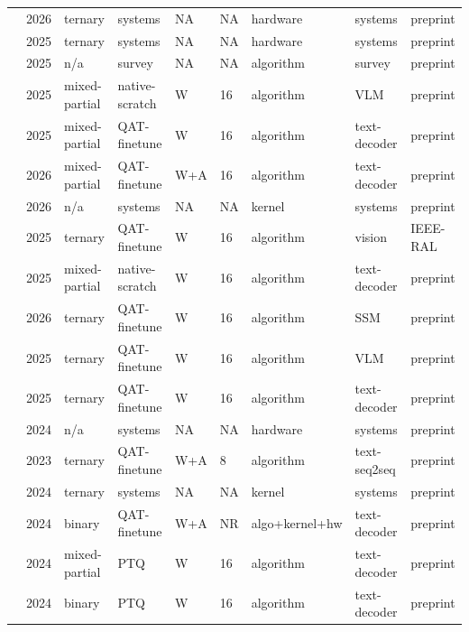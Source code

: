 \documentclass[11pt]{article}
\begin{document}
\begin{landscape}
\begin{longtable}{p{3.2cm} p{1cm} p{1.9cm} p{2.2cm} p{2.2cm} p{1.3cm} p{2.2cm} p{2.1cm} p{2.5cm}}
\citet{Guan2026-TOM} & 2026 & ternary & systems & NA & NA & hardware & systems & preprint \\
\citet{Qiao2025-TeLLMev2} & 2025 & ternary & systems & NA & NA & hardware & systems & preprint \\
\citet{Jorgensen2025-ResourceEfficientLMs} & 2025 & n/\allowbreak{}a & survey & NA & NA & algorithm & survey & preprint \\
\citet{Aman2025-BitMar} & 2025 & mixed-partial & native-scratch & W & 16 & algorithm & VLM & preprint \\
\citet{Chen2025-R2Q} & 2025 & mixed-partial & QAT-finetune & W & 16 & algorithm & text-decoder & preprint \\
\citet{Zhang2026-EdgeRazor} & 2026 & mixed-partial & QAT-finetune & W+\allowbreak{}A & 16 & algorithm & text-decoder & preprint \\
\citet{Dehghankar2026-RSRcore} & 2026 & n/\allowbreak{}a & systems & NA & NA & kernel & systems & preprint \\
\citet{Grainge2025-TeTRAVPR} & 2025 & ternary & QAT-finetune & W & 16 & algorithm & vision & IEEE-RAL \\
\citet{Wang2025-iFairy} & 2025 & mixed-partial & native-scratch & W & 16 & algorithm & text-decoder & preprint \\
\citet{Ganesaraja2026-TernaryMamba} & 2026 & ternary & QAT-finetune & W & 16 & algorithm & SSM & preprint \\
\citet{Zhang2025-TernaryCLIP} & 2025 & ternary & QAT-finetune & W & 16 & algorithm & VLM & preprint \\
\citet{Steinmetz2025-ExtraRMSNorm} & 2025 & ternary & QAT-finetune & W & 16 & algorithm & text-decoder & preprint \\
\citet{Ortega2024-PIMAI} & 2024 & n/\allowbreak{}a & systems & NA & NA & hardware & systems & preprint \\
\citet{Liu2023-BinTernNLG} & 2023 & ternary & QAT-finetune & W+\allowbreak{}A & 8 & algorithm & text-seq2seq & preprint \\
\citet{Wei2024-TMAC} & 2024 & ternary & systems & NA & NA & kernel & systems & preprint \\
\citet{Ji2024-BMTBAT} & 2024 & binary & QAT-finetune & W+\allowbreak{}A & NR & algo+\allowbreak{}kernel+\allowbreak{}hw & text-decoder & preprint \\
\citet{Xu2024-CRVQ} & 2024 & mixed-partial & PTQ & W & 16 & algorithm & text-decoder & preprint \\
\citet{Edalati2024-OAC} & 2024 & binary & PTQ & W & 16 & algorithm & text-decoder & preprint \\

\end{longtable}
\end{landscape}
\end{document}
